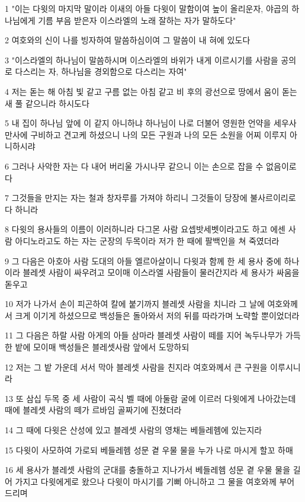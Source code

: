 \par 1 "이는 다윗의 마지막 말이라 이새의 아들 다윗이 말함이여 높이 올리운자, 야곱의 하나님에게 기름 부음 받은자 이스라엘의 노래 잘하는 자가 말하도다"
\par 2 여호와의 신이 나를 빙자하여 말씀하심이여 그 말씀이 내 혀에 있도다
\par 3 "이스라엘의 하나님이 말씀하시며 이스라엘의 바위가 내게 이르시기를 사람을 공의로 다스리는 자, 하나님을 경외함으로 다스리는 자여"
\par 4 저는 돋는 해 아침 빛 같고 구름 없는 아침 같고 비 후의 광선으로 땅에서 움이 돋는 새 풀 같으니라 하시도다
\par 5 내 집이 하나님 앞에 이 같지 아니하냐 하나님이 나로 더불어 영원한 언약을 세우사 만사에 구비하고 견고케 하셨으니 나의 모든 구원과 나의 모든 소원을 어찌 이루지 아니하시랴
\par 6 그러나 사악한 자는 다 내어 버리울 가시나무 같으니 이는 손으로 잡을 수 없음이로다
\par 7 그것들을 만지는 자는 철과 창자루를 가져야 하리니 그것들이 당장에 불사르이리로다 하니라
\par 8 다윗의 용사들의 이름이 이러하니라 다그몬 사람 요셉밧세벳이라고도 하고 에센 사람 아디노라고도 하는 자는 군장의 두목이라 저가 한 때에 팔백인을 쳐 죽였더라
\par 9 그 다음은 아호아 사람 도대의 아들 엘르아살이니 다윗과 함께 한 세 용사 중에 하나이라 블레셋 사람이 싸우려고 모이매 이스라엘 사람들이 물러간지라 세 용사가 싸움을 돋우고
\par 10 저가 나가서 손이 피곤하여 칼에 붙기까지 블레셋 사람을 치니라 그 날에 여호와께서 크게 이기게 하셨으므로 백성들은 돌아와서 저의 뒤를 따라가며 노략할 뿐이었더라
\par 11 그 다음은 하랄 사람 아게의 아들 삼마라 블레셋 사람이 떼를 지어 녹두나무가 가득한 밭에 모이매 백성들은 블레셋사람 앞에서 도망하되
\par 12 저는 그 밭 가운데 서서 막아 블레셋 사람을 친지라 여호와께서 큰 구원을 이루시니라
\par 13 또 삼십 두목 중 세 사람이 곡식 벨 때에 아둘람 굴에 이르러 다윗에게 나아갔는데 때에 블레셋 사람의 떼가 르바임 골짜기에 진쳤더라
\par 14 그 때에 다윗은 산성에 있고 블레셋 사람의 영채는 베들레헴에 있는지라
\par 15 다윗이 사모하여 가로되 베들레헴 성문 곁 우물 물을 누가 나로 마시게 할꼬 하매
\par 16 세 용사가 블레셋 사람의 군대를 충돌하고 지나가서 베들레헴 성문 곁 우물 물을 길어 가지고 다윗에게로 왔으나 다윗이 마시기를 기뻐 아니하고 그 물을 여호와께 부어 드리며
